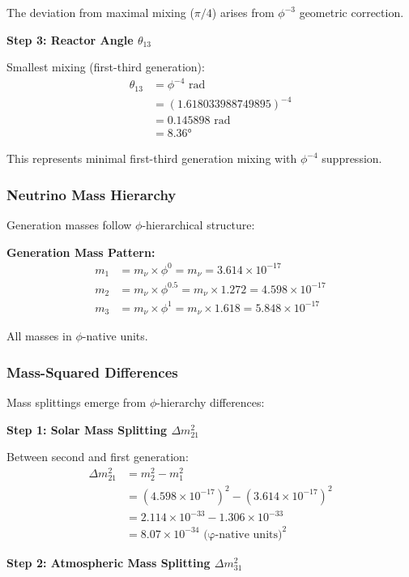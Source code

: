 The deviation from maximal mixing ($\pi/4$) arises from $\phi^{-3}$ geometric correction.

\textbf{Step 3: Reactor Angle $\theta_{13}$}

Smallest mixing (first-third generation):
\begin{align}
\theta_{13} &= \phi^{-4} \text{ rad} \\
&= (1.618033988749895)^{-4} \\
&= 0.145898 \text{ rad} \\
&= 8.36°
\end{align}

This represents minimal first-third generation mixing with $\phi^{-4}$ suppression.

\subsubsection{Neutrino Mass Hierarchy}

Generation masses follow $\phi$-hierarchical structure:

\textbf{Generation Mass Pattern:}
\begin{align}
m_1 &= m_\nu \times \phi^0 = m_\nu = 3.614 \times 10^{-17} \\
m_2 &= m_\nu \times \phi^{0.5} = m_\nu \times 1.272 = 4.598 \times 10^{-17} \\
m_3 &= m_\nu \times \phi^{1} = m_\nu \times 1.618 = 5.848 \times 10^{-17}
\end{align}

All masses in $\phi$-native units.

\subsubsection{Mass-Squared Differences}

Mass splittings emerge from $\phi$-hierarchy differences:

\textbf{Step 1: Solar Mass Splitting $\Delta m_{21}^2$}

Between second and first generation:
\begin{align}
\Delta m_{21}^2 &= m_2^2 - m_1^2 \\
&= (4.598 \times 10^{-17})^2 - (3.614 \times 10^{-17})^2 \\
&= 2.114 \times 10^{-33} - 1.306 \times 10^{-33} \\
&= 8.07 \times 10^{-34} \text{ (φ-native units)}^2
\end{align}

\textbf{Step 2: Atmospheric Mass Splitting $\Delta m_{31}^2$}

